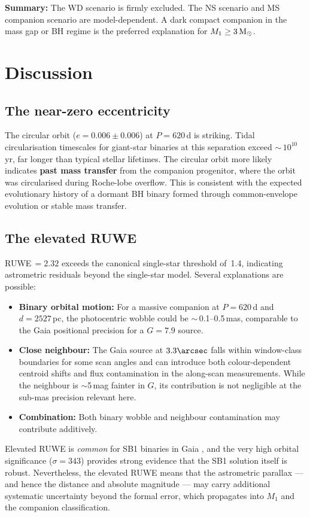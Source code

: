 \documentclass[usenatbib,fleqn]{mnras}
\newcommand{\Msun}{{\rm M}_\odot}
\begin{document}
\medskip\noindent
\textbf{Summary:} The WD scenario is firmly excluded.  The NS
scenario and MS companion scenario are model-dependent.  A dark
compact companion in the mass gap or BH regime is the preferred
explanation for $M_1 \ge 3\,\Msun$.

\section{Discussion}
\label{sec:discussion}

\subsection{The near-zero eccentricity}
\label{sec:discussion:ecc}

The circular orbit ($e = 0.006 \pm 0.006$) at $P = 620$\,d is
striking.  Tidal circularisation timescales for giant-star
binaries at this separation exceed $\sim$\,$10^{10}$\,yr,
far longer than typical stellar lifetimes.  The circular orbit
more likely indicates \textbf{past mass transfer} from the
companion progenitor, where the orbit was circularised during
Roche-lobe overflow.  This is consistent with the expected
evolutionary history of a dormant BH binary formed through
common-envelope evolution or stable mass transfer.

\subsection{The elevated RUWE}
\label{sec:discussion:ruwe}

RUWE\,$= 2.32$ exceeds the canonical single-star threshold of~1.4,
indicating astrometric residuals beyond the single-star model.
Several explanations are possible:
\begin{itemize}
\item \textbf{Binary orbital motion:} For a massive companion at
  $P = 620$\,d and $d = 2527$\,pc, the photocentric wobble could
  be $\sim$\,0.1--0.5\,mas, comparable to the Gaia positional
  precision for a $G = 7.9$ source.
\item \textbf{Close neighbour:} The Gaia source at $3.3\arcsec$
  falls within window-class boundaries for some scan angles and
  can introduce both colour-dependent centroid shifts and flux
  contamination in the along-scan measurements.  While the
  neighbour is $\sim$5\,mag fainter in $G$, its contribution is
  not negligible at the sub-mas precision relevant here.
\item \textbf{Combination:} Both binary wobble and neighbour
  contamination may contribute additively.
\end{itemize}
Elevated RUWE is \emph{common} for SB1 binaries in Gaia
\citep{GaiaNSS2023}, and the very high orbital significance
($\sigma = 343$) provides strong evidence that the SB1 solution
itself is robust.  Nevertheless, the elevated RUWE means that the
astrometric parallax --- and hence the distance and absolute
magnitude --- may carry additional systematic uncertainty beyond
the formal error, which propagates into $M_1$ and the companion
classification.
\end{document}
